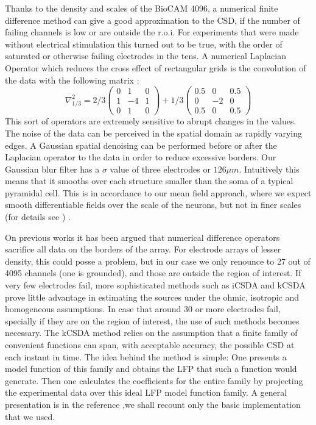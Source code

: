 \documentclass{article}
\begin{document}
Thanks to the density and scales of the BioCAM 4096, a numerical finite difference method
can give a good approximation to the CSD, if the number of failing channels is low or
are outside the r.o.i.
For experiments that were made without electrical stimulation this turned out to be true, with the order of saturated or otherwise failing electrodes in the tens.  A  numerical Laplacian Operator which reduces the cross effect of rectangular grids is the convolution of the data with the following matrix \cite{Lindberg90}:
\begin{equation}
\nabla^2_{1/3}=2/3
\begin{pmatrix}
  0 & 1 & 0 \\
  1 & -4 & 1 \\
  0 & 1 & 0
\end{pmatrix}
+1/3
\begin{pmatrix}
  0.5 & 0 & 0.5 \\
  0 & -2 & 0 \\
  0.5 & 0 & 0.5
\end{pmatrix}  
\end{equation}
This sort of operators are extremely sensitive to abrupt changes in the values. The noise of the data can be perceived in the spatial domain as rapidly varying edges. A Gaussian spatial denoising can be performed before or after the Laplacian operator to the data in order to reduce excessive borders. Our Gaussian blur filter has a $\sigma$ value of three electrodes or $126 \mu m$. Intuitively this means that it smooths over each structure smaller than the soma of a typical pyramidal cell. 
This is  in accordance to our mean field approach, where we expect smooth differentiable fields over the scale of the neurons, but not in finer scales (for details see \cite{Bedard11}) .

On previous works it has been argued that numerical difference operators sacrifice all data on the borders of the array. For electrode arrays of lesser density, this could posse a problem, but in our case we only renounce to 27 out of 4095 channels (one is grounded), and those are outside the region of interest.
If very few electrodes fail, more sophisticated methods such as iCSDA \cite{Leski2011} and kCSDA \cite{Potworowski2011} prove little advantage in estimating the sources under the ohmic, isotropic and homogeneous assumptions. In case that around 30 or more electrodes
fail, specially if they are on the region of interest, the use of such methods
becomes necessary. The kCSDA method relies on the
assumption that a finite family of convenient functions can span, with acceptable accuracy, the possible CSD at each instant in time. The idea behind the method is simple:
One presents a model function of this family and obtains the LFP that such a function
would generate. Then one calculates the coefficients for the entire family by projecting the
experimental data over this ideal LFP model function family. A general presentation is in the reference \cite{Potworowski2011},we shall recount only the basic implementation that we used.
\end{document}

